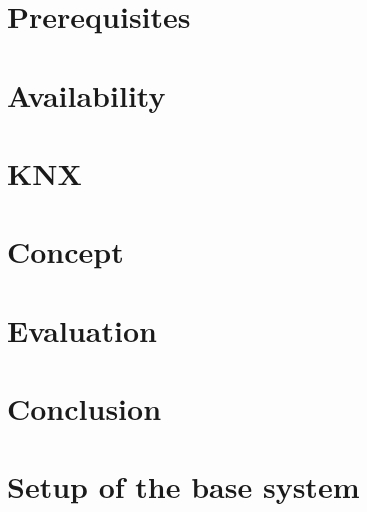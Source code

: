 \documentclass[a4paper,12pt,oneside,openright]{memoir}
\begin{document}
\chapter{Prerequisites}
\label{ch:prerequisites}




\chapter{Availability}
\label{ch:availability}



\chapter{KNX}
\label{ch:knx}






\chapter{Concept}
\label{ch:concept}



\chapter{Evaluation}
\label{ch:implementation}



\chapter{Conclusion}
\label{ch:conclusion}




\appendix

\nocite{*}	%

\chapter{Setup of the base system}
\label{ch:basesystem}


\printglossary
\printbibliography
\end{document}
